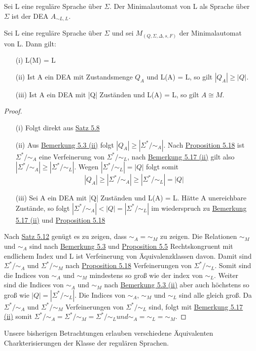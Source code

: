   Sei L eine reguläre Sprache über \(\Sigma\). Der Minimalautomat von L als Sprache über \(\Sigma\) ist der DEA \(A_{\sim L, L}\).

  Sei L eine reguläre Sprache über \(\Sigma\) und sei \(M_(Q, \Sigma, \Delta, s ,F)\) der Minimalautomat von L. Dann gilt:
  \begin{itemize}
    \item [(i)] L(M) = L
    \item [(ii)] Ist A ein DEA mit Zustandsmenge \(Q_A\) und L(A) = L, so gilt \(|Q_A| \geq |Q|\).
    \item [(iii)] Ist A ein DEA mit |Q| Zuständen und L(A) = L, so gilt \(A \cong M\).
  \end{itemize}
  \begin{proof}
    \begin{itemize}
      \item [(i)] Folgt direkt aus \hyperref[subsec:5.8]{Satz 5.8} 
      \item [(ii)] Aus \hyperref[subsec:5.3]{Bemerkung 5.3 (ii)} folgt \(|Q_A| \geq |\Sigma^* / \sim_A|\). Nach \hyperref[subsec:5.18]{Proposition 5.18} ist \(\Sigma^* / \sim_A\) eine Verfeinerung von \(\Sigma^* / \sim_L\), nach \hyperref[subsec:5.17]{Bemerkung 5.17 (ii)} gilt also \(|\Sigma^* / \sim_A| \geq |\Sigma^* / \sim_L|\). Wegen \(|\Sigma^* / \sim_L| = |Q|\) folgt somit 
      \[
        |Q_A| \geq |\Sigma^* / \sim_A| \geq |\Sigma^* / \sim_L| = |Q|
      \]
      \item [(iii)] Sei A ein DEA mit |Q| Zuständen und L(A) = L. Hätte A unereichbare Zustände, so folgt \(|\Sigma^* / \sim_A| < |Q| = |\Sigma^* /\sim_L|\) im wiederspruch zu \hyperref[subsec:5.17]{Bemerkung 5.17 (ii)} und \hyperref[subsec:5.18]{Proposition 5.18} 
    \end{itemize}
    Nach \hyperref[subsec:5.12]{Satz 5.12} genügt es zu zeigen, dass \(\sim_A = \sim_M\) zu zeigen. Die Relationen \(\sim_M\) und \(\sim_A\) sind nach \hyperref[subsec:5.3]{Bemerkung 5.3} und \hyperref[subsec:5.5]{Proposition 5.5} Rechtskongruent mit endlichem Index und L ist Verfeinerung von Äquivalenzklassen davon. Damit sind \(\Sigma^* / \sim_A\) und \(\Sigma^* / \sim_M\) nach \hyperref[subsec:5.18]{Proposition 5.18} Verfeinerungen von \(\Sigma^* /\sim_L\). Somit sind die Indices von \(\sim_A\) und \(\sim_M\) mindestens so groß wie der index von \(\sim_L\). Weiter sind die Indices von \(\sim_A\) und \(\sim_M\) nach \hyperref[subsec:5.3]{Bemerkung 5.3 (ii)} aber auch höchstens so groß wie \(|Q| = |\Sigma^* / \sim_L|\). Die Indices von \(\sim_A\), \(\sim_M\) und \(\sim_L\) sind alle gleich groß. Da \(\Sigma^* / \sim_A\) und \(\Sigma^* / \sim_M\) Verfeinerungen von \(\Sigma^* /\sim_L\) sind, folgt mit \hyperref[subsec:5.17]{Bemerkung 5.17 (ii)} somit \(\Sigma^* /\sim_A = \Sigma^* /\sim_M = \Sigma^* /\sim_L und \sim_A = \sim_L = \sim_M\). 
  \end{proof}
  Unsere bisherigen Betrachtungen erlauben verschiedene Äquivalenten Charkterisierungen der Klasse der regulären Sprachen.

